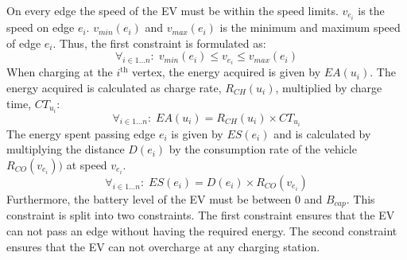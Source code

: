On every edge the speed of the EV must be within the speed limits. $v_{e_i}$ is the speed on edge $e_i$. $v_{min}(e_i)$ and $v_{max}(e_i)$ is the minimum and maximum speed of edge $e_i$. Thus, the first constraint is formulated as:
\begin{equation*}
\forall_{i\in1 \dots n }:\;v_{min}(e_i) \leq v_{e_i} \leq v_{max}(e_i)
\end{equation*}
When charging at the $i^{\text{th}}$ vertex, the energy acquired is given by $EA(u_i)$. The energy acquired is calculated as charge rate, $R_{CH}(u_i)$, multiplied by charge time, $CT_{u_i}$:
\begin{equation*}
\forall_{i\in1 \dots n }:\; EA(u_i) = R_{CH}(u_i) \times CT_{u_i}
\end{equation*}
The energy spent passing edge $e_i$ is given by $ES(e_i)$ and is calculated by multiplying the distance $D(e_i)$ by the consumption rate of the vehicle $R_{CO}(v_{e_i}))$ at speed $v_{e_i}$.
\begin{equation*}
\forall_{i\in1 \dots n }:\; ES(e_i) = D(e_i) \times R_{CO}(v_{e_i})
\end{equation*}
Furthermore, the battery level of the EV must be between $0$ and $B_{cap}$.
This constraint is split into two constraints. The first constraint ensures that the EV can not pass an edge without having the required energy. The second constraint ensures that the EV can not overcharge at any charging station. 

